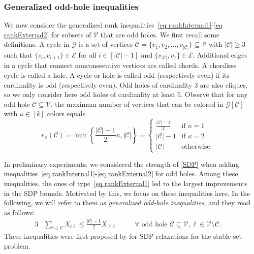 \documentclass[11pt, a4paper]{article}
\newcommand{\mc}{\mathcal}
\begin{document}
\subsubsection{Generalized odd-hole inequalities} \label{Sec: Odd-hole inequalities}
We now consider the generalized rank inequalities~\eqref{eq rankInternal1}-\eqref{eq rankExternal2} for subsets of $\mc{V}$ that are odd holes.
We first recall some definitions.
A cycle in $\mc{G}$ is a set of vertices $\mc{C} = \{v_1, v_2, \hdots, v_{|\mc{C}|}\} \subseteq \mc{V}$ with $|\mc{C}| \geq 3$ such that $\{v_i,v_{i+1}\} \in \mc{E}$ for all $i \in [|\mc{C}|-1]$ and $\{v_{|\mc{C}|}, v_1\} \in \mc{E}$.
Additional edges in a cycle that connect nonconsecutive vertices are called chords. A chordless cycle is called a hole. A cycle or hole is called odd (respectively even) if its cardinality is odd (respectively even).
Odd holes of cardinality $3$ are also cliques, so we only consider here odd holes of cardinality at least $5$.
Observe that for any odd hole $\mc{C} \subseteq \mc{V}$, the maximum number of vertices that can be colored in $\mc{G}[\mc{C}]$ with $\kappa \in [k]$ colors equals
$$r_\kappa(\mc{C}) = \min\left\{\frac{|\mc{C}|-1}{2} \kappa, |\mc{C}|\right\} = \begin{cases}
    \frac{|\mc{C}|-1}{2} & \text{if $\kappa=1$} \\
    |\mc{C}|-1 & \text{if $\kappa=2$} \\
    |\mc{C}| & \text{otherwise}.
\end{cases}$$

In preliminary experiments, we considered the strength of \eqref{SDP} when adding inequalities~\eqref{eq rankInternal1}-\eqref{eq rankExternal2} for odd holes. 
Among these inequalities, the ones of type~\eqref{eq rankExternal1} led to the largest improvements in the SDP bounds. 
Motivated by this, we focus on these inequalities here. In the following, we will refer to them as \textit{generalized odd-hole inequalities}, and they read as follows:
\begin{alignat}{3}
    & \sum_{i \in \mc{C}} X_{i\ell} \leq \frac{|\mc{C}|-1}{2} X_{\ell\ell} &\quad& \forall \text{ odd hole } \mc{C} \subseteq \mc{V}, \ell \in \mc{V} \setminus \mc{C}. \label{eq HoleExternal1}
\end{alignat}
These inequalities were first proposed by \citet{Pucher2025PracticalExperience} for SDP relaxations for the stable set problem.
\end{document}
